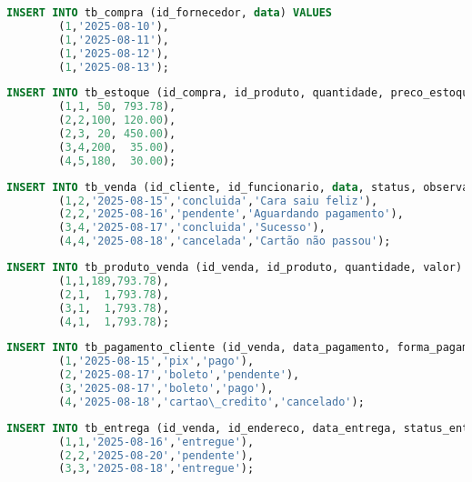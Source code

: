 \documentclass[
12pt,
a4paper,
semrecuonosumario,
sumario = abnt-6027-2012]{report}
\begin{document}
    \begin{lstlisting}[language=SQL,caption={DML -- Tabela \texttt{tb\_compra}}]
        INSERT INTO tb_compra (id_fornecedor, data) VALUES
        (1,'2025-08-10'),
        (1,'2025-08-11'),
        (1,'2025-08-12'),
        (1,'2025-08-13');
    \end{lstlisting}
    
    \begin{lstlisting}[language=SQL,caption={DML -- Tabela \texttt{tb\_estoque}}]
        INSERT INTO tb_estoque (id_compra, id_produto, quantidade, preco_estoque) VALUES
        (1,1, 50, 793.78),
        (2,2,100, 120.00),
        (2,3, 20, 450.00),
        (3,4,200,  35.00),
        (4,5,180,  30.00);
    \end{lstlisting}
    
    \begin{lstlisting}[language=SQL,caption={DML -- Tabela \texttt{tb\_venda}}]
        INSERT INTO tb_venda (id_cliente, id_funcionario, data, status, observacao_venda) VALUES
        (1,2,'2025-08-15','concluida','Cara saiu feliz'),
        (2,2,'2025-08-16','pendente','Aguardando pagamento'),
        (3,4,'2025-08-17','concluida','Sucesso'),
        (4,4,'2025-08-18','cancelada','Cartão não passou');
    \end{lstlisting}
    
    \begin{lstlisting}[language=SQL,caption={DML -- Tabela \texttt{tb\_produto\_venda}}]
        INSERT INTO tb_produto_venda (id_venda, id_produto, quantidade, valor) VALUES
        (1,1,189,793.78),
        (2,1,  1,793.78),
        (3,1,  1,793.78),
        (4,1,  1,793.78);
    \end{lstlisting}
    
    \begin{lstlisting}[language=SQL,caption={DML -- Tabela \texttt{tb\_pagamento\_cliente}}]
        INSERT INTO tb_pagamento_cliente (id_venda, data_pagamento, forma_pagamento, status_pagamento) VALUES
        (1,'2025-08-15','pix','pago'),
        (2,'2025-08-17','boleto','pendente'),
        (3,'2025-08-17','boleto','pago'),
        (4,'2025-08-18','cartao\_credito','cancelado');
    \end{lstlisting}
    
    \begin{lstlisting}[language=SQL,caption={DML -- Tabela \texttt{tb\_entrega}}]
        INSERT INTO tb_entrega (id_venda, id_endereco, data_entrega, status_entrega) VALUES
        (1,1,'2025-08-16','entregue'),
        (2,2,'2025-08-20','pendente'),
        (3,3,'2025-08-18','entregue');
    \end{lstlisting}
    
\end{document}
